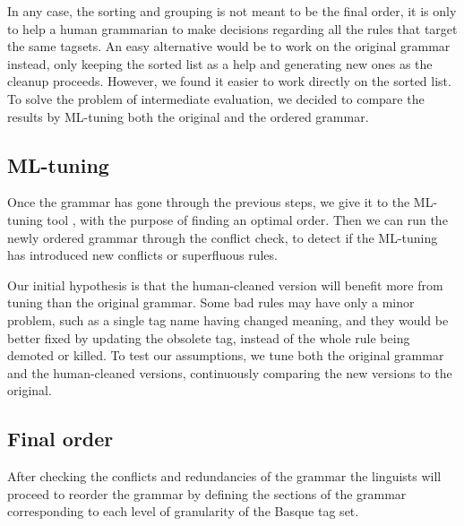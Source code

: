 \documentclass[11pt]{article}
\begin{document}
In any case, the sorting and grouping is not meant to be the final order, it is only 
to help a human grammarian to make decisions regarding all the rules that 
target the same tagsets.
An easy alternative would be to work on the original grammar instead, only
keeping the sorted list as a help and generating new ones as the
cleanup proceeds. However, we found it easier to work directly on the
sorted list. To solve the problem of intermediate evaluation, we
decided to compare the results by ML-tuning both the original and the
ordered grammar.

\subsection{ML-tuning}
Once the grammar has gone through the previous steps, we give it to the 
ML-tuning tool \cite{bick2013tuning}, with the purpose of finding an 
optimal order. Then we can run the newly ordered grammar through the
conflict check, to detect if the ML-tuning has introduced new
conflicts or superfluous rules.

Our initial hypothesis is that the human-cleaned version will benefit more 
from tuning than the original grammar. Some bad rules may have only a minor 
problem, such as a single tag name having changed meaning, and they would be 
better fixed by updating the obsolete tag, instead of the whole rule being 
demoted or killed. To test our assumptions, we tune both the original
grammar and the human-cleaned versions, continuously comparing the new
versions to the original.



\subsection{Final order}

After checking the conflicts and redundancies of the grammar the
linguists will proceed to reorder the grammar by defining the sections
of the grammar corresponding to each level of granularity of the Basque tag set.
\end{document}
